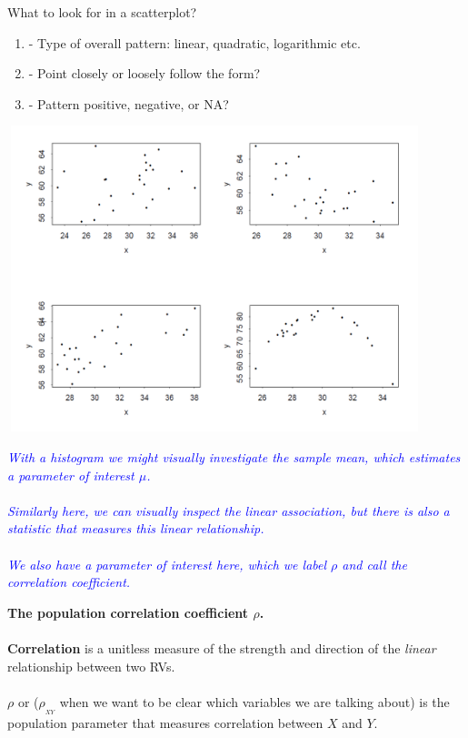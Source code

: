 \newpage

What to look for in a scatterplot? \\
\begin{enumerate}
	\item %
	\underbar{~~~~~~~~~~~~~~~~~~~~~~~~~~~~~~~~~} 
	- Type of overall pattern: linear, quadratic, logarithmic etc.\\
	\item %
	\underbar{~~~~~~~~~~~~~~~~~~~~~~~~~~~~~~~~~} 
	- Point closely or loosely follow the form?\\
	\item %
	\underbar{~~~~~~~~~~~~~~~~~~~~~~~~~~~~~~~~~} 
	- Pattern positive, negative, or NA?
\end{enumerate}

\begin{center}
\includegraphics[height=3.5in,width=4.75in]{scattermatch}
\end{center}

\textit{\textcolor{blue}{With a histogram we might visually investigate the sample mean, which estimates a parameter of interest $\mu$.\\~\\
Similarly here, we can visually inspect the linear association, but there is also a statistic that measures this linear relationship.  \\~\\
We also have a parameter of interest here, which we label $\rho$ and call the correlation coefficient.}}

\newpage

\Large \textbf{The population correlation coefficient $\rho$.} \large\\~\\
\textbf{Correlation} is a unitless measure of the strength and direction of the \textit{linear} relationship between two RVs.\\~\\
$\rho$ or ($\rho_{_{XY}}$ when we want to be clear which variables we are talking about) is the population parameter that measures correlation between $X$ and $Y$.\\

